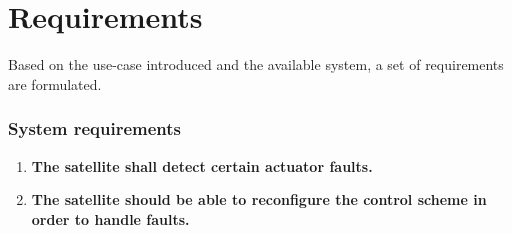 \chapter{Requirements}\label{chap:requirements}
Based on the use-case introduced and the available system, a set of requirements are formulated.
%
\subsection*{System requirements}
%
\begin{enumerate}
	\item \textbf{The satellite shall detect certain actuator faults.}
	
	
	
	\item \textbf{The satellite should be able to reconfigure the control scheme in order to handle faults.}
	
	
	
\end{enumerate}


